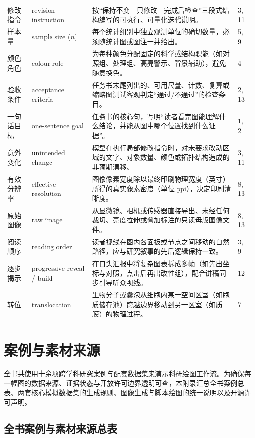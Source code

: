\begin{longtable}{@{}p{26mm}p{32mm}p{54mm}p{8mm}@{}}
修改指令 & revision instruction & 按“保持不变—只修改—完成后检查”三段式结构编写的可执行、可量化迭代说明。 & 3, 11 \\
样本量 & sample size ($n$) & 每个统计组别中独立观测单位的确切数量，必须随统计图或图注一并给出。 & 5, 9 \\
颜色角色 & colour role & 为每种颜色分配固定的科学或结构职能（如对照组、处理组、高亮警示、背景辅助），避免随意换色。 & 4 \\
验收条件 & acceptance criteria & 任务书末尾列出的、可用尺量、计数、复算或缩略图测试客观判定“通过/不通过”的检查条目。 & 2, 13 \\
一句话目标 & one-sentence goal & 任务书的核心句，写明“读者看完图能理解什么结论，并能从图中哪个位置找到什么证据”。 & 1, 2 \\
意外变化 & unintended change & 模型在执行局部修改指令时，对未要求改动区域的文字、对象数量、颜色或拓扑结构造成的非预期漂移。 & 3, 11 \\
有效分辨率 & effective resolution & 图像像素宽度除以最终印刷物理宽度（英寸）所得的真实像素密度（单位 ppi），决定印刷清晰度。 & 8, 13 \\
原始图像 & raw image & 从显微镜、相机或传感器直接导出、未经任何裁切、亮度拉伸或叠加标注的只读母版图像文件。 & 8, 13 \\
阅读顺序 & reading order & 读者视线在图内各面板或节点之间移动的自然路径，应与研究叙事的先后逻辑保持一致。 & 3, 9 \\
逐步揭示 & progressive reveal / build & 在口头汇报中将复杂图表拆成多帧（如先出坐标与对照，点击后再出改性组），配合讲稿同步引导听众视线。 & 12 \\
转位 & translocation & 生物分子或囊泡从细胞内某一空间区室（如胞质储存池）跨越边界移动到另一区室（如质膜）的物理过程。 & 7 \\
\end{longtable}
\endgroup

\chapter{案例与素材来源}
\label{app:case-sources}

全书共使用十余项跨学科研究案例与配套数据集来演示科研绘图工作流。为确保每一幅图的数据来源、证据状态与开放许可边界透明可查，本附录汇总全书案例总表、两套核心模拟数据集的生成规则、图像生成与脚本绘图的统一说明以及开源许可声明。

\section{全书案例与素材来源总表}

